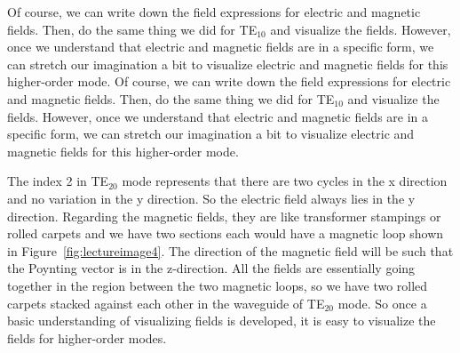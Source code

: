 Of course, we can write down the field expressions for electric and magnetic fields. Then, do the same thing we did for TE$_{10}$ and visualize the fields. However, once we understand that electric and magnetic fields are in a specific form, we can stretch our imagination a bit to visualize electric and magnetic fields for this higher-order mode.
Of course, we can write down the field expressions for electric and magnetic fields. Then, do the same thing we did for TE$_{10}$ and visualize the fields. However, once we understand that electric and magnetic fields are in a specific form, we can stretch our imagination a bit to visualize electric and magnetic fields for this higher-order mode.

The index 2 in TE$_{20}$ mode represents that there are two cycles in the x direction and no variation in the y direction. So the electric field always lies in the y direction. Regarding the magnetic fields, they are like transformer stampings or rolled carpets and we have two sections each would have a magnetic loop shown in Figure~\ref{fig:lectureimage4}. The direction of the magnetic field will be such that the Poynting vector is in the z-direction. All the fields are essentially going together in the region between the two magnetic loops, so we have two rolled carpets stacked against each other in the waveguide of TE$_{20}$ mode. So once a basic understanding of visualizing fields is developed, it is easy to visualize the fields for higher-order modes.

